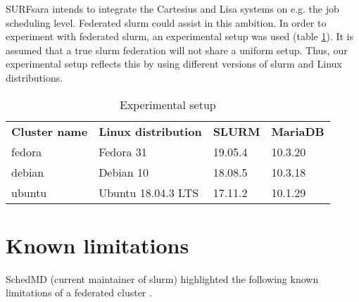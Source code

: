 \documentclass[conference]{IEEEtran}
\begin{document}
SURFsara intends to integrate the Cartesius and Lisa systems on e.g. the job scheduling level. Federated \gls{slurm} could assist in this ambition. In order to experiment with federated \gls{slurm}, an experimental setup was used (table \ref{tab-experimental-setup}). It is assumed that a true \gls{slurm} federation will not share a uniform setup. Thus, our experimental setup reflects this by using different versions of \gls{slurm} and Linux distributions.

\begin{table}[H]
\begin{center}
\caption{Experimental setup}
\label{tab-experimental-setup}
\begin{tabular}{llll}
\textbf{Cluster name} & \textbf{Linux distribution} & \textbf{SLURM} & \textbf{MariaDB} \\
fedora                & Fedora 31                   & 19.05.4        & 10.3.20          \\
debian                & Debian 10                   & 18.08.5        & 10.3.18          \\
ubuntu                & Ubuntu 18.04.3 LTS          & 17.11.2        & 10.1.29         
\end{tabular}
\end{center}
\end{table}


\section{Known limitations}
\label{sec-limitations}
SchedMD (current maintainer of \gls{slurm}) highlighted the following known limitations of a federated cluster \cite{slurm-federated-guide}.
\end{document}

